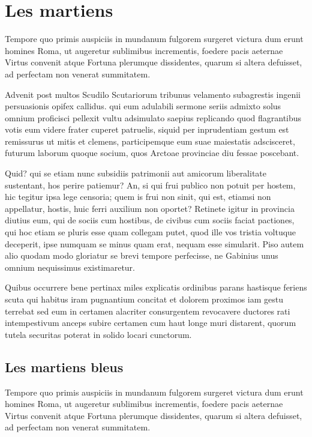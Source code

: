 \documentclass{framatexclass}
\begin{document}
\section{Les martiens}
Tempore quo primis auspiciis in mundanum fulgorem surgeret victura dum erunt homines Roma, ut augeretur sublimibus incrementis, foedere pacis aeternae Virtus convenit atque Fortuna plerumque dissidentes, quarum si altera defuisset, ad perfectam non venerat summitatem.

Advenit post multos Scudilo Scutariorum tribunus velamento subagrestis ingenii persuasionis opifex callidus. qui eum adulabili sermone seriis admixto solus omnium proficisci pellexit vultu adsimulato saepius replicando quod flagrantibus votis eum videre frater cuperet patruelis, siquid per inprudentiam gestum est remissurus ut mitis et clemens, participemque eum suae maiestatis adscisceret, futurum laborum quoque socium, quos Arctoae provinciae diu fessae poscebant.

Quid? qui se etiam nunc subsidiis patrimonii aut amicorum liberalitate sustentant, hos perire patiemur? An, si qui frui publico non potuit per hostem, hic tegitur ipsa lege censoria; quem is frui non sinit, qui est, etiamsi non appellatur, hostis, huic ferri auxilium non oportet? Retinete igitur in provincia diutius eum, qui de sociis cum hostibus, de civibus cum sociis faciat pactiones, qui hoc etiam se pluris esse quam collegam putet, quod ille vos tristia voltuque deceperit, ipse numquam se minus quam erat, nequam esse simularit. Piso autem alio quodam modo gloriatur se brevi tempore perfecisse, ne Gabinius unus omnium nequissimus existimaretur.

Quibus occurrere bene pertinax miles explicatis ordinibus parans hastisque feriens scuta qui habitus iram pugnantium concitat et dolorem proximos iam gestu terrebat sed eum in certamen alacriter consurgentem revocavere ductores rati intempestivum anceps subire certamen cum haut longe muri distarent, quorum tutela securitas poterat in solido locari cunctorum.

\subsection{Les martiens bleus}
Tempore quo primis auspiciis in mundanum fulgorem surgeret victura dum erunt homines Roma, ut augeretur sublimibus incrementis, foedere pacis aeternae Virtus convenit atque Fortuna plerumque dissidentes, quarum si altera defuisset, ad perfectam non venerat summitatem.
\end{document}
